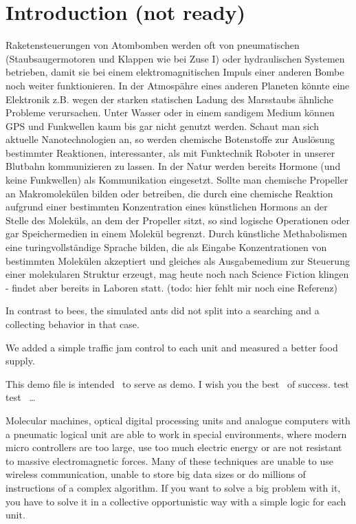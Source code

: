 \section{Introduction (not ready)}\label{introduction-not-ready}

Raketensteuerungen von Atombomben werden oft von pneumatischen
(Staubsaugermotoren und Klappen wie bei Zuse I) oder hydraulischen
Systemen betrieben, damit sie bei einem elektromagnitischen Impuls einer
anderen Bombe noch weiter funktionieren. In der Atmospähre eines anderen
Planeten könnte eine Elektronik z.B. wegen der starken statischen Ladung
des Marsstaubs ähnliche Probleme verursachen. Unter Wasser oder in einem
sandigem Medium können GPS und Funkwellen kaum bis gar nicht genutzt
werden. Schaut man sich aktuelle Nanotechnologien an, so werden
chemische Botenstoffe zur Auslösung bestimmter Reaktionen,
interessanter, als mit Funktechnik Roboter in unserer Blutbahn
kommunizieren zu lassen. In der Natur werden bereits Hormone (und keine
Funkwellen) als Kommunikation eingesetzt. Sollte man chemische Propeller
an Makromolekülen bilden oder betreiben, die durch eine chemische
Reaktion aufgrund einer bestimmten Konzentration eines künstlichen
Hormons an der Stelle des Moleküls, an dem der Propeller sitzt, so sind
logische Operationen oder gar Speichermedien in einem Molekül begrenzt.
Durch künstliche Methabolismen eine turingvollständige Sprache bilden,
die als Eingabe Konzentrationen von bestimmten Molekülen akzeptiert und
gleiches als Ausgabemedium zur Steuerung einer molekularen Struktur
erzeugt, mag heute noch nach Science Fiction klingen - findet aber
bereits in Laboren statt. (todo: hier fehlt mir noch eine Referenz)

In contrast to bees, the simulated ants did not split into a searching
and a collecting behavior in that case.

We added a simple traffic jam control to each unit and measured a better
food supply.

This demo file is intended~\cite{Tentschert2000} to serve as demo. I wish
you the best~\cite{li2014chaos} of success. test
test~\cite{gonzalez2017smells} \ldots{}

Molecular machines, optical digital processing units and analogue
computers with a pneumatic logical unit are able to work in special
environments, where modern micro controllers are too large, use too much
electric energy or are not resistant to massive electromagnetic forces.
Many of these techniques are unable to use wireless communication,
unable to store big data sizes or do millions of instructions of a
complex algorithm. If you want to solve a big problem with it, you have
to solve it in a collective opportunistic way with a simple logic for
each unit.

